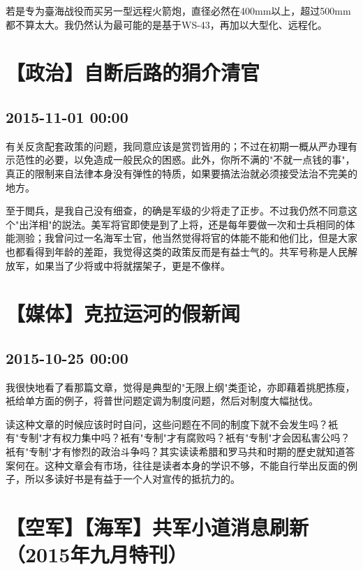 \documentclass[twocolumn]{ctexart}
\begin{document}
若是专为臺海战役而买另一型远程火箭炮，直径必然在400mm以上，超过500mm都不算太大。我仍然认为最可能的是基于WS-43，再加以大型化、远程化。\section*{【政治】自断后路的狷介清官}
\subsection*{2015-11-01 00:00}
有关反贪配套政策的问题，我同意应该是赏罚皆用的；不过在初期一概从严办理有示范性的必要，以免造成一般民众的困惑。此外，你所不满的"不就一点钱的事"，真正的限制来自法律本身没有弹性的特质，如果要搞法治就必须接受法治不完美的地方。

至于閲兵，是我自己没有细查，的确是军级的少将走了正步。不过我仍然不同意这个"出洋相"的説法。美军将官即使是到了上将，还是每年要做一次和士兵相同的体能测验；我曾问过一名海军士官，他当然觉得将官的体能不能和他们比，但是大家也都看得到年龄的差距，我觉得这类的政策反而是有益士气的。共军号称是人民解放军，如果当了少将或中将就摆架子，更是不像样。\section*{【媒体】克拉运河的假新闻}
\subsection*{2015-10-25 00:00}
我很快地看了看那篇文章，觉得是典型的"无限上纲"类歪论，亦即藉着挑肥拣瘦，衹给单方面的例子，将普世问题定调为制度问题，然后对制度大幅挞伐。

读这种文章的时候应该时时自问，这些问题在不同的制度下就不会发生吗？衹有"专制"才有权力集中吗？衹有"专制"才有腐败吗？衹有"专制"才会因私害公吗？衹有"专制"才有惨烈的政治斗争吗？其实读读希腊和罗马共和时期的歷史就知道答案何在。这种文章会有市场，往往是读者本身的学识不够，不能自行举出反面的例子，所以多读好书是有益于一个人对宣传的抵抗力的。\section*{【空军】【海军】共军小道消息刷新（2015年九月特刊）}
\end{document}
